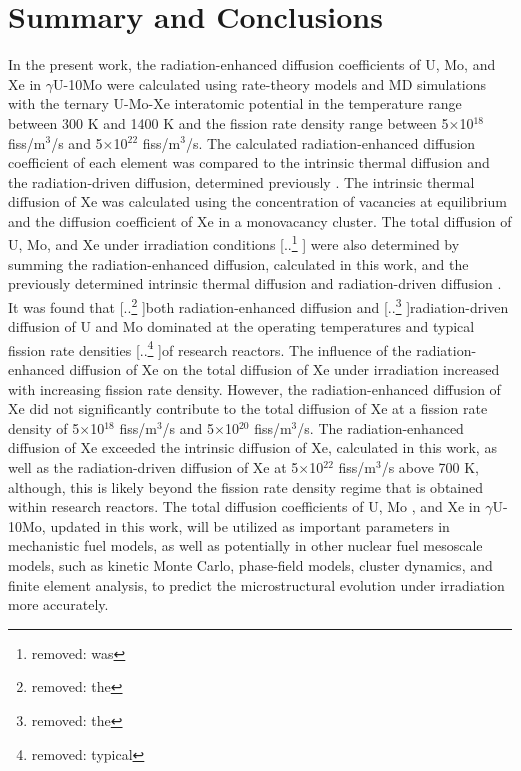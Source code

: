 \documentclass[preprint,12pt]{elsarticle}
\providecommand{\DIFadd}[1]{{\protect\color{blue} \sf #1}} %
\providecommand{\DIFdel}[1]{{\protect\color{red} [..\footnote{removed: #1} ]}} %
\providecommand{\DIFaddbegin}{} %
\providecommand{\DIFaddend}{} %
\providecommand{\DIFdelbegin}{} %
\providecommand{\DIFdelend}{} %
\newcommand{\DIFscaledelfig}{0.5}
\newlength{\DIFdelgraphicswidth} %
\newlength{\DIFdelgraphicsheight} %
\newcommand{\DIFaddincludegraphics}[2][]{{\color{blue}\fbox{\DIFOincludegraphics[#1]{#2}}}} %
\newcommand{\DIFdelincludegraphics}[2][]{%
\sbox{\DIFdelgraphicsbox}{\DIFOincludegraphics[#1]{#2}}%
\settoboxwidth{\DIFdelgraphicswidth}{\DIFdelgraphicsbox} %
\settoboxtotalheight{\DIFdelgraphicsheight}{\DIFdelgraphicsbox} %
\scalebox{\DIFscaledelfig}{%
\parbox[b]{\DIFdelgraphicswidth}{\usebox{\DIFdelgraphicsbox}\\[-\baselineskip] \rule{\DIFdelgraphicswidth}{0em}}\llap{\resizebox{\DIFdelgraphicswidth}{\DIFdelgraphicsheight}{%
\setlength{\unitlength}{\DIFdelgraphicswidth}%
\begin{picture}(1,1)%
\thicklines\linethickness{2pt} %
{\color[rgb]{1,0,0}\put(0,0){\framebox(1,1){}}}%
{\color[rgb]{1,0,0}\put(0,0){\line( 1,1){1}}}%
{\color[rgb]{1,0,0}\put(0,1){\line(1,-1){1}}}%
\end{picture}%
}\hspace*{3pt}}} %
} %
\DeclareRobustCommand{\DIFaddbegin}{\DIFOaddbegin \let\includegraphics\DIFaddincludegraphics} %
\DeclareRobustCommand{\DIFaddend}{\DIFOaddend \let\includegraphics\DIFOincludegraphics} %
\DeclareRobustCommand{\DIFdelbegin}{\DIFOdelbegin \let\includegraphics\DIFdelincludegraphics} %
\DeclareRobustCommand{\DIFdelend}{\DIFOaddend \let\includegraphics\DIFOincludegraphics} %
\begin{document}
\section{Summary and Conclusions}
In the present work, the radiation-enhanced diffusion coefficients of U, Mo, and Xe in $\gamma$U-10Mo were calculated using rate-theory models and MD simulations with the ternary U-Mo-Xe interatomic potential \cite{smirnova2013ternary} in the temperature range between 300 K and 1400 K and the fission rate density range between 5$\times$10$^{18}$ fiss/m$^{3}$/s and 5$\times$10$^{22}$ fiss/m$^{3}$/s. The calculated radiation-enhanced diffusion coefficient of each element was compared to the intrinsic thermal diffusion and the radiation-driven diffusion, determined previously  \cite{beeler2021radiation, huang2013}. The intrinsic thermal diffusion of Xe was calculated using the concentration of vacancies at equilibrium and the diffusion coefficient of Xe in a monovacancy cluster. The total diffusion of U, Mo, and Xe under irradiation conditions \DIFdelbegin \DIFdel{was }\DIFdelend \DIFaddbegin \DIFadd{were }\DIFaddend also determined by summing the radiation-enhanced diffusion, calculated in this work, and the previously determined intrinsic thermal diffusion and radiation-driven diffusion \cite{beeler2021radiation, huang2013}. It was found that \DIFdelbegin \DIFdel{the }\DIFdelend both radiation-enhanced diffusion and \DIFdelbegin \DIFdel{the }\DIFdelend radiation-driven diffusion of U and Mo dominated at the operating temperatures and \DIFaddbegin \DIFadd{typical }\DIFaddend fission rate densities \DIFdelbegin \DIFdel{typical }\DIFdelend of research reactors. The influence of the radiation-enhanced diffusion of Xe on the total diffusion of Xe under irradiation increased with increasing fission rate density. However, the radiation-enhanced diffusion of Xe did not significantly contribute to the total diffusion of Xe at a fission rate density of 5$\times$10$^{18}$ fiss/m$^{3}$/s \DIFaddbegin \DIFadd{and 5$\times$10$^{20}$ fiss/m$^{3}$/s}\DIFaddend . The radiation-enhanced diffusion of Xe exceeded the intrinsic diffusion of Xe, calculated in this work, as well as the radiation-driven diffusion of Xe at 5$\times$10$^{22}$ fiss/m$^{3}$/s above 700 K, although, this is likely beyond the fission rate density regime that is obtained within research reactors. The total diffusion coefficients of U, Mo\DIFaddbegin \DIFadd{, }\DIFaddend and Xe in $\gamma$U-10Mo, updated in this work, will be utilized as important parameters in mechanistic fuel models, as well as potentially in other nuclear fuel  mesoscale models, such as kinetic Monte Carlo, phase-field models, cluster dynamics, and finite element analysis, to predict the microstructural evolution under irradiation more accurately. 
\end{document}
